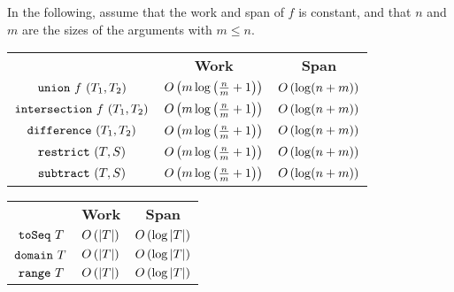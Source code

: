 \begin{costspec}[Combination]
In the following, assume that the work and span of $f$ is constant, and that
$n$ and $m$ are the sizes of the arguments with $m \leq n$.
\begin{tabular}{c|c|c}
& \textbf{Work} & \textbf{Span} \\
$\texttt{union}~f~(T_1, T_2)$ &
$O\left({m \log\left(\frac n m + 1\right)}\right)$ &
$O\left({\log(n + m)}\right)$
\\
$\texttt{intersection}~f~(T_1, T_2)$ &
$O\left({m \log\left(\frac n m + 1\right)}\right)$ &
$O\left({\log(n + m)}\right)$
\\
$\texttt{difference}~(T_1, T_2)$ &
$O\left({m \log\left(\frac n m + 1\right)}\right)$ &
$O\left({\log(n + m)}\right)$
\\
$\texttt{restrict}~(T, S)$ &
$O\left({m \log\left(\frac n m + 1\right)}\right)$ &
$O\left({\log(n + m)}\right)$
\\
$\texttt{subtract}~(T, S)$ &
$O\left({m \log\left(\frac n m + 1\right)}\right)$ &
$O\left({\log(n + m)}\right)$
\end{tabular}
\end{costspec}

\begin{costspec}[Miscellaneous]
\begin{tabular}{c|c|c}
& \textbf{Work} & \textbf{Span} \\
$\texttt{toSeq}~T$ & $O\left({|T|}\right)$ & $O\left({\log|T|}\right)$ \\
$\texttt{domain}~T$ & $O\left({|T|}\right)$ & $O\left({\log|T|}\right)$ \\
$\texttt{range}~T$ & $O\left({|T|}\right)$ & $O\left({\log|T|}\right)$
\end{tabular}
\end{costspec}

